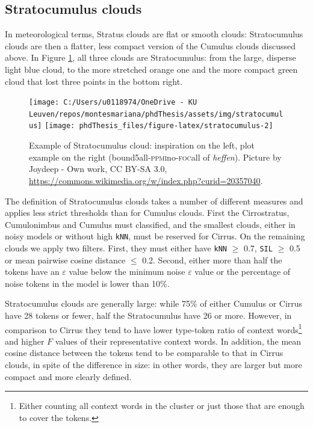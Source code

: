 \documentclass[
]{book}
\begin{document}
\hypertarget{stratocumulus-clouds}{%
\subsection{Stratocumulus clouds}\label{stratocumulus-clouds}}

In meteorological terms, Stratus clouds are flat or smooth clouds: Stratocumulus clouds are then a flatter, less compact version of the Cumulus clouds discussed above. In Figure \ref{fig:stratocumulus}, all three clouds are Stratocumulus: from the large, disperse light blue cloud, to the more stretched orange one and the more compact green cloud that lost three points in the bottom right.



\begin{figure}
\texttt{[image: C:/Users/u0118974/OneDrive - KU Leuven/repos/montesmariana/phdThesis/assets/img/stratocumulus]} \texttt{[image: phdThesis\_files/figure-latex/stratocumulus-2]} \caption{Example of Stratocumulus cloud: inspiration on the left, plot example on the right (bound5all-\textsc{ppmi}no-\textsc{foc}all of \emph{heffen}). Picture by Joydeep - Own work, CC BY-SA 3.0, \url{https://commons.wikimedia.org/w/index.php?curid=20357040}.}\label{fig:stratocumulus}
\end{figure}

The definition of Stratocumulus clouds takes a number of different measures and applies less strict thresholds than for Cumulus clouds. First the Cirrostratus, Cumulonimbus and Cumulus must classified, and the smallest clouds, either in noisy models or without high \texttt{kNN}, must be reserved for Cirrus. On the remaining clouds we apply two filters. First, they must either have \texttt{kNN} \(\ge\) 0.7, \texttt{SIL} \(\ge\) 0.5 or mean pairwise cosine distance \(\le\) 0.2. Second, either more than half the tokens have an \(\varepsilon\) value below the minimum noise \(\varepsilon\) value or the percentage of noise tokens in the model is lower than 10\%.

Stratocumulus clouds are generally large: while 75\% of either Cumulus or Cirrus have
28 tokens or fewer, half the Stratocumulus have 26 or more.
However, in comparison to Cirrus they tend to have lower type-token ratio of context words\footnote{Either counting all context words in the cluster or just those that are enough to cover the tokens.} and higher \(F\) values of their representative context words. In addition, the mean cosine distance between the tokens tend to be comparable to that in Cirrus clouds, in spite of the difference in size: in other words, they are larger but more compact and more clearly defined.
\end{document}
